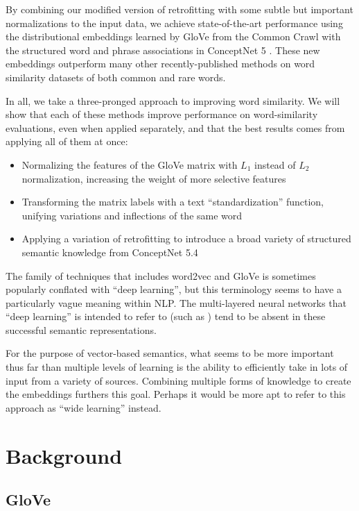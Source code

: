 \documentclass[letterpaper]{article}
\begin{document}
By combining our modified version of retrofitting with some subtle but important
normalizations to the input data, we achieve state-of-the-art performance using
the distributional embeddings learned by GloVe \cite{pennington2014glove} from
the Common Crawl \cite{TODOcrawl} with the structured word and phrase
associations in ConceptNet 5 \cite{speer2012conceptnet}. These new embeddings
outperform many other recently-published methods on word similarity datasets of
both common and rare words.

In all, we take a three-pronged approach to improving word similarity. We will
show that each of these methods improve performance on word-similarity
evaluations, even when applied separately, and that the best results comes from
applying all of them at once:

\begin{itemize}
\item Normalizing the features of the GloVe matrix with $L_1$ instead of $L_2$
    normalization, increasing the weight of more selective features
\item Transforming the matrix labels with a text ``standardization'' function,
    unifying variations and inflections of the same word
\item Applying a variation of retrofitting to introduce a broad variety of
    structured semantic knowledge from ConceptNet 5.4
\end{itemize}

The family of techniques that includes word2vec and GloVe is sometimes
popularly conflated with ``deep learning'', but this terminology seems to have
a particularly vague meaning within NLP. The multi-layered neural networks that
``deep learning'' is intended to refer to (such as )
tend to be absent in these successful semantic representations.

For the purpose of vector-based semantics, what seems to be more important thus
far than multiple levels of learning is the ability to efficiently take in lots
of input from a variety of sources. Combining multiple forms of knowledge to
create the embeddings furthers this goal. Perhaps it would be more apt to refer
to this approach as ``wide learning'' instead.

\section{Background}

\subsection{GloVe}
\end{document}
